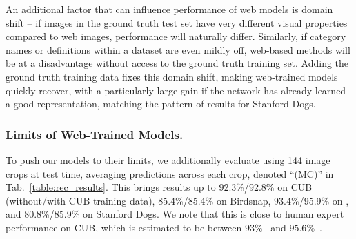 \documentclass[runningheads]{llncs}
\begin{document}
An additional factor that can influence performance of web models is domain shift -- if images in the ground truth test set have very different visual properties compared to web images, performance will naturally differ.
Similarly, if category names or definitions within a dataset are even mildly off, web-based methods will be at a disadvantage without access to the ground truth training set.
Adding the ground truth training data fixes this domain shift, making web-trained models quickly recover, with a particularly large gain if the network has already learned a good representation, matching the pattern of results for Stanford Dogs.



\subsubsection{Limits of Web-Trained Models.}
To push our models to their limits, we additionally evaluate using 144 image crops at test time, averaging predictions across each crop, denoted ``(MC)'' in Tab.~\ref{table:rec_results}.
This brings results up to 92.3\%/92.8\% on CUB (without/with CUB training data), 85.4\%/85.4\% on Birdsnap, 93.4\%/95.9\% on \fgvc{}, and 80.8\%/85.9\% on Stanford Dogs.
We note that this is close to human expert performance on CUB, which is estimated to be between $93\%$~\cite{branson2014ignorant} and $95.6\%$~\cite{horn2015}.
\end{document}
